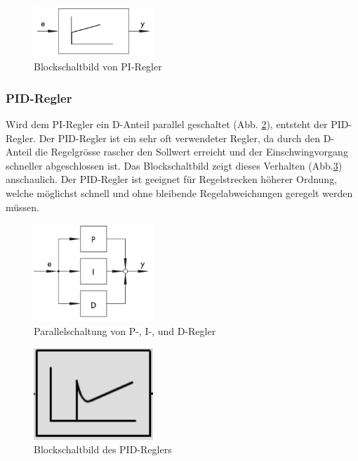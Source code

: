\begin{figure}[h!, width=\pagewidth]
    \centering
    \includegraphics[width=0.4\textwidth]{images/PIRegler2}
    \caption{Blockschaltbild von PI-Regler}
    \label{fig:PIRegler2}
\end{figure}


\subsubsection{PID-Regler}

Wird    dem    PI-Regler    ein    D-Anteil    parallel    geschaltet    (Abb.
\ref{fig:PRDRegler1}), entsteht  der PID-Regler. Der  PID-Regler ist  ein sehr
oft verwendeter  Regler, da durch  den D-Anteil die Regelgr\"osse  rascher den
Sollwert erreicht  und der Einschwingvorgang schneller  abgeschlossen ist. Das
Blockschaltbild  zeigt dieses  Verhalten (Abb.\ref{fig:PID})  anschaulich. Der
PID-Regler  ist   geeignet  f\"ur  Regelstrecken  h\"oherer   Ordnung,  welche
m\"oglichst  schnell  und  ohne bleibende  Regelabweichungen  geregelt  werden
m\"ussen.

\begin{figure}[h!, width=\pagewidth]
    \centering
    \includegraphics[width=0.4\textwidth]{images/PRDRegler1}
    \caption{Parallelschaltung von P-, I-, und D-Regler}
    \label{fig:PRDRegler1}
\end{figure}

\begin{figure}[h!, width=\pagewidth]
    \centering
    \includegraphics[width=0.4\textwidth]{images/PID}
    \caption{Blockschaltbild des PID-Reglers}
    \label{fig:PID}
\end{figure}
